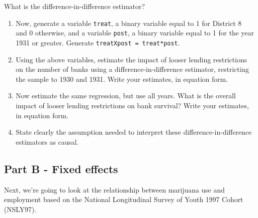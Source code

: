 \documentclass[11pt]{article}
\begin{document}
What is the difference-in-difference estimator?

\begin{enumerate}
\def\labelenumi{\arabic{enumi}.}
\setcounter{enumi}{4}
\item
  Now, generate a variable \texttt{treat}, a binary variable equal to 1
  for District 8 and 0 otherwise, and a variable \texttt{post}, a binary
  variable equal to 1 for the year 1931 or greater. Generate
  \texttt{treatXpost\ =\ treat*post}.
\item
  Using the above variables, estimate the impact of looser lending
  restrictions on the number of banks using a difference-in-difference
  estimator, restricting the sample to 1930 and 1931. Write your
  estimates, in equation form.
\item
  Now estimate the same regression, but use all years. What is the
  overall impact of looser lending restrictions on bank survival? Write
  your estimates, in equation form.
\item
  State clearly the assumption needed to interpret these
  difference-in-difference estimators as causal.
\end{enumerate}

\hypertarget{part-b---fixed-effects}{%
\subsection*{Part B - Fixed effects}\label{part-b---fixed-effects}}

Next, we're going to look at the relationship between marijuana use and
employment based on the National Longitudinal Survey of Youth 1997
Cohort (NSLY97).
\end{document}
